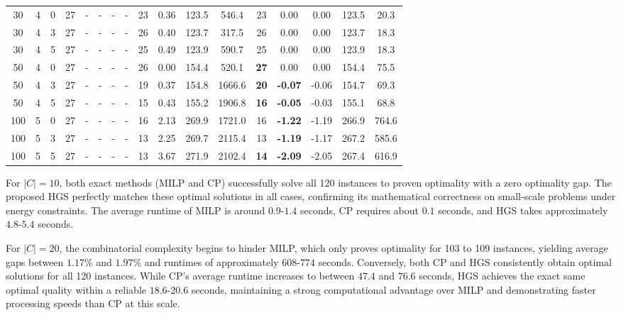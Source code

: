 \documentclass[3p, authoryear, 11pt]{elsarticle}
\begin{document}
\begin{table}[H]
\begin{tabular}{cccc cccc cccc ccccc}
    
    30 & 4 & 0 & 27 & - & - & - & - & 23 & 0.36 & 123.5 & 546.4 & 23 & 0.00 & 0.00 & 123.5 & 20.3 \\
    30 & 4 & 3 & 27 & - & - & - & - & 26 & 0.40 & 123.7 & 317.5 & 26 & 0.00 & 0.00 & 123.7 & 18.3 \\
    30 & 4 & 5 & 27 & - & - & - & - & 25 & 0.49 & 123.9 & 590.7 & 25 & 0.00 & 0.00 & 123.9 & 18.3 \\
    \midrule
    
    50 & 4 & 0 & 27 & - & - & - & - & 26 & 0.00 & 154.4 & 520.1 & \textbf{27} & 0.00 & 0.00 & 154.4 & 75.5 \\
    50 & 4 & 3 & 27 & - & - & - & - & 19 & 0.37 & 154.8 & 1666.6 & \textbf{20} & \textbf{-0.07} & -0.06 & 154.7 & 69.3 \\
    50 & 4 & 5 & 27 & - & - & - & - & 15 & 0.43 & 155.2 & 1906.8 & \textbf{16} & \textbf{-0.05} & -0.03 & 155.1 & 68.8 \\
    \midrule
    
    100 & 5 & 0 & 27 & - & - & - & - & 16 & 2.13 & 269.9 & 1721.0 & 16 & \textbf{-1.22} & -1.19 & 266.9 & 764.6 \\
    100 & 5 & 3 & 27 & - & - & - & - & 13 & 2.25 & 269.7 & 2115.4 & 13 & \textbf{-1.19} & -1.17 & 267.2 & 585.6 \\
    100 & 5 & 5 & 27 & - & - & - & - & 13 & 3.67 & 271.9 & 2102.4 & \textbf{14} & \textbf{-2.09} & -2.05 & 267.4 & 616.9 \\

    \bottomrule
    \end{tabular}
\end{table}

For $|C|=10$, both exact methods (MILP and CP) successfully solve all 120 instances to proven optimality with a zero optimality gap. The proposed HGS perfectly matches these optimal solutions in all cases, confirming its mathematical correctness on small-scale problems under energy constraints. The average runtime of MILP is around $0.9$-$1.4$ seconds, CP requires about $0.1$ seconds, and HGS takes approximately $4.8$-$5.4$ seconds.

For $|C|=20$, the combinatorial complexity begins to hinder MILP, which only proves optimality for 103 to 109 instances, yielding average gaps between $1.17\%$ and $1.97\%$ and runtimes of approximately $608$-$774$ seconds. Conversely, both CP and HGS consistently obtain optimal solutions for all 120 instances. While CP's average runtime increases to between $47.4$ and $76.6$ seconds, HGS achieves the exact same optimal quality within a reliable $18.6$-$20.6$ seconds, maintaining a strong computational advantage over MILP and demonstrating faster processing speeds than CP at this scale.
\end{document}

